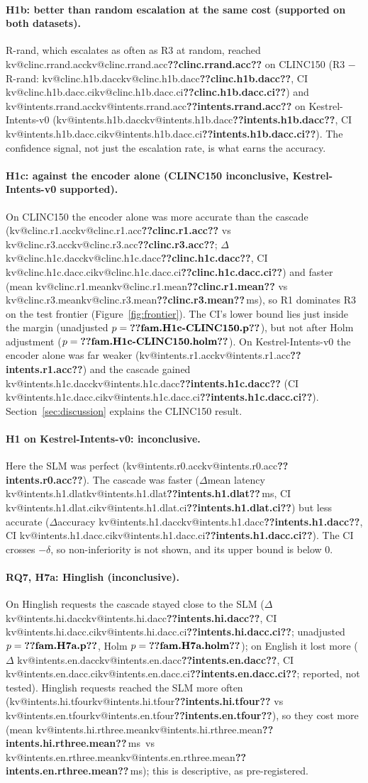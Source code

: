 \documentclass[11pt,a4paper]{article}
\makeatletter
\DeclareRobustCommand{\kv}[1]{\ifcsname kv@#1\endcsname\csname kv@#1\endcsname\else\textbf{??#1??}\fi}
\newcommand{\ms}{\,ms}
\makeatother
\begin{document}
\paragraph{H1b: better than random escalation at the same cost (supported on both datasets).} R-rand, which escalates
as often as R3 at random, reached \kv{clinc.rrand.acc} on CLINC150 (R3 $-$ R-rand: \kv{clinc.h1b.dacc}, CI
\kv{clinc.h1b.dacc.ci}) and \kv{intents.rrand.acc} on Kestrel-Intents-v0 (\kv{intents.h1b.dacc}, CI
\kv{intents.h1b.dacc.ci}). The confidence signal, not just the escalation rate, is what earns the accuracy.

\paragraph{H1c: against the encoder alone (CLINC150 inconclusive, Kestrel-Intents-v0 supported).} On CLINC150 the
encoder alone was more accurate than the cascade (\kv{clinc.r1.acc} vs \kv{clinc.r3.acc}; $\Delta$
\kv{clinc.h1c.dacc}, CI \kv{clinc.h1c.dacc.ci}) and faster (mean \kv{clinc.r1.mean} vs \kv{clinc.r3.mean}\ms), so
R1 dominates R3 on the test frontier
(Figure~\ref{fig:frontier}). The CI's lower bound lies just inside the margin (unadjusted $p=\kv{fam.H1c-CLINC150.p}$),
but not after Holm adjustment ($p=\kv{fam.H1c-CLINC150.holm}$). On Kestrel-Intents-v0 the encoder alone was far weaker
(\kv{intents.r1.acc}) and the cascade gained \kv{intents.h1c.dacc} (CI \kv{intents.h1c.dacc.ci}). Section~\ref{sec:discussion}
explains the CLINC150 result.

\paragraph{H1 on Kestrel-Intents-v0: inconclusive.} Here the SLM was perfect (\kv{intents.r0.acc}). The cascade
was faster ($\Delta$mean latency \kv{intents.h1.dlat}\ms, CI \kv{intents.h1.dlat.ci}) but less accurate
($\Delta$accuracy \kv{intents.h1.dacc}, CI \kv{intents.h1.dacc.ci}). The CI crosses $-\delta$, so non-inferiority is not shown, and its upper bound is below 0.

\paragraph{RQ7, H7a: Hinglish (inconclusive).} On Hinglish requests the cascade stayed close to the SLM
($\Delta$ \kv{intents.hi.dacc}, CI \kv{intents.hi.dacc.ci}; unadjusted $p=\kv{fam.H7a.p}$, Holm
$p=\kv{fam.H7a.holm}$); on English it lost more ($\Delta$ \kv{intents.en.dacc}, CI \kv{intents.en.dacc.ci}; reported,
not tested). Hinglish requests reached the SLM more often (\kv{intents.hi.tfour} vs \kv{intents.en.tfour}), so they cost
more (mean \kv{intents.hi.rthree.mean}\ms\ vs \kv{intents.en.rthree.mean}\ms); this is descriptive, as pre-registered.
\end{document}
